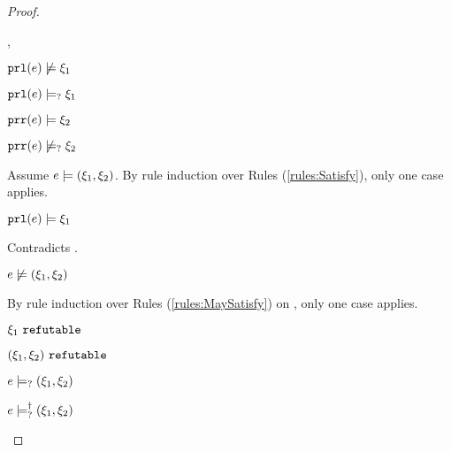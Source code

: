 \begin{proof}
\begin{byCases}
\begin{byCases}
\begin{byCases}
        \item[\cmaysatisfy{\hprl{e}}{\xi_1},\csatisfy{\hprr{e}}{\xi_2}]
            \begin{pfsteps*}
            \item $\mathtt{prl}(e) \not\models \xi_1$  
            \item $\mathtt{prl}(e) \models_{?} \xi_1$  
            \item $\mathtt{prr}(e) \models \xi_2$  
            \item $\mathtt{prr}(e) \not\models_{?} \xi_2$  
            \end{pfsteps*}
            Assume $e \models (\xi_1 , \xi_2)$. By rule induction over Rules (\ref{rules:Satisfy}), only one case applies.
            \begin{byCases}
            \item[\text{(\ref{rule:CSNotValPair})}]
                \begin{pfsteps*}
                \item $\mathtt{prl}(e) \models \xi_1$ 
                \end{pfsteps*}
                Contradicts .
            \end{byCases}
            \begin{pfsteps*}
            \item $e \not\models (\xi_1 , \xi_2)$  
            \end{pfsteps*}
            By rule induction over Rules (\ref{rules:MaySatisfy}) on , only one case applies. 
            \begin{byCases}
            \item[\text{(\ref{rule:CMSNotVal})}]
                \begin{pfsteps*}
                \item $\xi_1 ~\mathtt{refutable}$  
                \item $(\xi_1 , \xi_2) ~\mathtt{refutable}$  
                \item $e \models_{?} (\xi_1 , \xi_2)$  
                \item $e \models_{?}^{\dag} (\xi_1 , \xi_2)$ 
                \end{pfsteps*}
            \end{byCases}
            

\end{byCases}
\end{byCases}
\end{byCases}
\end{proof}

